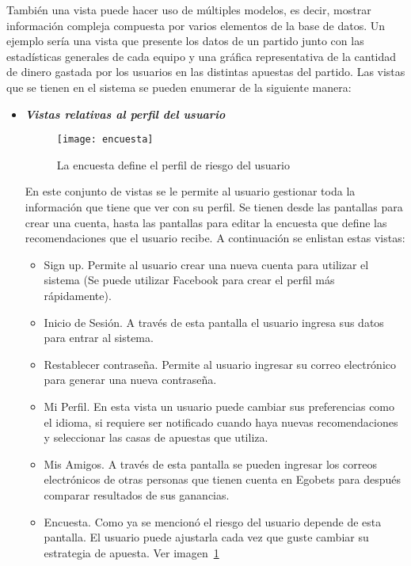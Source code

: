 		También una vista puede hacer uso de múltiples modelos, es decir, mostrar información compleja compuesta por varios elementos de la base de datos. Un ejemplo sería una vista que presente los datos de un partido junto con las estadísticas generales de cada equipo y una gráfica representativa de la cantidad de dinero gastada por los usuarios en las distintas apuestas del partido.
		Las vistas que se tienen en el sistema se pueden enumerar de la siguiente manera:
		\begin{itemize}
			\item \emph{\textbf{Vistas relativas al perfil del usuario}}

			\begin{figure}[!htb]\centering
			   \begin {minipage}{0.7\textwidth}
			     \texttt{[image: encuesta]}
			     \caption{La encuesta define el perfil de riesgo del usuario}\label{Fig:encuesta}
			   \end{minipage}
			\end{figure}

			En este conjunto de vistas se le permite al usuario gestionar toda la información que tiene que ver con su perfil. Se tienen desde las pantallas para crear una cuenta, hasta las pantallas para editar la encuesta que define las recomendaciones que el usuario recibe.
			A continuación se enlistan estas vistas:
			\begin{itemize}
				\item Sign up. Permite al usuario crear una nueva cuenta para utilizar el sistema (Se puede utilizar Facebook \cite{facebookDocuWeb} para crear el perfil más rápidamente).
				\item Inicio de Sesión. A través de esta pantalla el usuario ingresa sus datos para entrar al sistema.
				\item Restablecer contraseña. Permite al usuario ingresar su correo electrónico para generar una nueva contraseña.
				\item Mi Perfil. En esta vista un usuario puede cambiar sus preferencias como el idioma, si requiere ser notificado cuando haya nuevas recomendaciones y seleccionar las casas de apuestas que utiliza.
				\item Mis Amigos. A través de esta pantalla se pueden ingresar los correos electrónicos de otras personas que tienen cuenta en Egobets para después comparar resultados de sus ganancias.
				\item Encuesta. Como ya se mencionó el riesgo del usuario depende de esta pantalla. El usuario puede ajustarla cada vez que guste cambiar su estrategia de apuesta. Ver imagen~\ref{Fig:encuesta}



\end{itemize}
\end{itemize}
